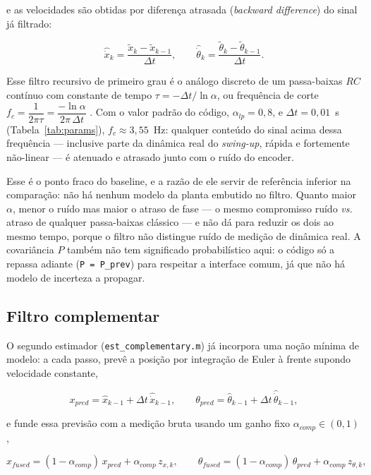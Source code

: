\documentclass[brazil, 12pt]{article}
\begin{document}
e as velocidades são obtidas por diferença atrasada (\emph{backward
difference}) do sinal já filtrado:

\[
\hat{\dot x}_k = \frac{\tilde x_k - \tilde x_{k-1}}{\Delta t},
\qquad
\hat{\dot\theta}_k = \frac{\tilde\theta_k - \tilde\theta_{k-1}}{\Delta t}.
\]

Esse filtro recursivo de primeiro grau é o análogo discreto de um passa-baixas
$RC$ contínuo com constante de tempo $\tau = -\Delta t/\ln\alpha$, ou
frequência de corte
$f_c = \dfrac{1}{2\pi\tau} = \dfrac{-\ln\alpha}{2\pi\,\Delta t}$
\cite{oppenheim}. Com o valor padrão do código, $\alpha_{lp}=0{,}8$, e
$\Delta t = 0{,}01$~s (Tabela~\ref{tab:params}), $f_c \approx 3{,}55$~Hz:
qualquer conteúdo do sinal acima dessa frequência --- inclusive parte da
dinâmica real do \emph{swing-up}, rápida e fortemente não-linear --- é
atenuado e atrasado junto com o ruído do encoder.

Esse é o ponto fraco do baseline, e a razão de ele servir de referência
inferior na comparação: não há nenhum modelo da planta embutido no filtro.
Quanto maior $\alpha$, menor o ruído mas maior o atraso de fase --- o mesmo
compromisso ruído \emph{vs.} atraso de qualquer passa-baixas clássico
\cite{oppenheim} --- e não dá para reduzir os dois ao mesmo tempo, porque o
filtro não distingue ruído de medição de dinâmica real. A covariância $P$
também não tem significado probabilístico aqui: o código só a repassa adiante
(\texttt{P = P\_prev}) para respeitar a interface comum, já que não há modelo
de incerteza a propagar.

\subsection{Filtro complementar}
\label{sec:complementar}

O segundo estimador (\texttt{est\_complementary.m}) já incorpora uma noção
mínima de modelo: a cada passo, prevê a posição por integração de Euler à
frente supondo velocidade constante,

\[
x_{pred} = \hat x_{k-1} + \Delta t\,\hat{\dot x}_{k-1},
\qquad
\theta_{pred} = \hat\theta_{k-1} + \Delta t\,\hat{\dot\theta}_{k-1},
\]

e funde essa previsão com a medição bruta usando um ganho fixo
$\alpha_{comp}\in(0,1)$,

\[
x_{fused} = (1-\alpha_{comp})\,x_{pred} + \alpha_{comp}\,z_{x,k},
\qquad
\theta_{fused} = (1-\alpha_{comp})\,\theta_{pred} + \alpha_{comp}\,z_{\theta,k},
\]
\end{document}
